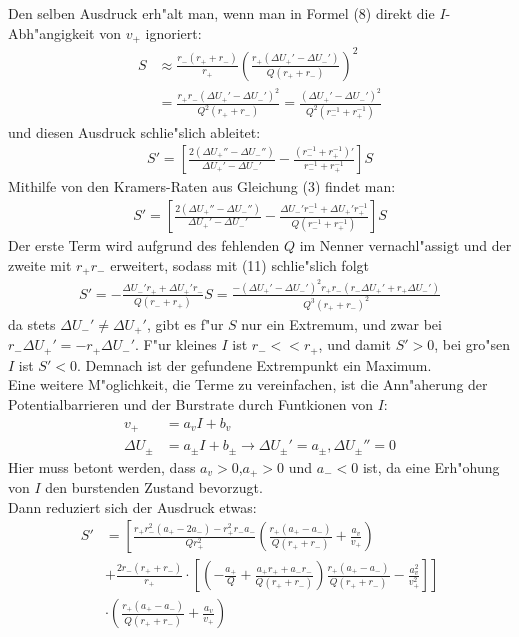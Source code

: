 \documentclass[12pt,a4paper]{article}
\begin{document}
Den selben Ausdruck erh"alt man, wenn man in Formel (8) direkt die $I$-Abh"angigkeit von $v_+$ ignoriert:
\begin{align}
S&\approx\frac{r_-(r_++r_-)}{r_+}\left(\frac{r_+(\Delta U_+'-\Delta U_-')}{Q(r_++r_-)}\right)^2\\
&=\frac{r_+r_-(\Delta U_+'-\Delta U_-')^2}{Q^2(r_++r_-)}=\frac{(\Delta U_+'-\Delta U_-')^2}{Q^2(r_-^{-1}+r_+^{-1})}
\end{align}
und diesen Ausdruck schlie"slich ableitet:
\begin{align*}
S'=\left[\frac{2(\Delta U_+''-\Delta U_-'')}{\Delta U_+'-\Delta U_-'}-\frac{(r_-^{-1}+r_+^{-1})'}{r_-^{-1}+r_+^{-1}}\right]S
\end{align*}
Mithilfe von den Kramers-Raten aus Gleichung (3) findet man:
\begin{align*}
S'=\left[\frac{2(\Delta U_+''-\Delta U_-'')}{\Delta U_+'-\Delta U_-'}-\frac{\Delta U_-'r_-^{-1}+\Delta U_+'r_+^{-1}}{Q(r_-^{-1}+r_+^{-1})}\right]S
\end{align*}
Der erste Term wird aufgrund des fehlenden $Q$ im Nenner vernachl"assigt und der zweite mit $r_+r_-$ erweitert, sodass mit (11) schlie"slich folgt
\begin{align*}
S'=-\frac{\Delta U_-'r_++\Delta U_+'r_-}{Q(r_-+r_+)}S=\frac{-(\Delta U_+'-\Delta U_-')^2r_+r_-(r_-\Delta U_+'+r_+\Delta U_-')}{Q^3(r_++r_-)^2}
\end{align*}
da stets $\Delta U_-'\neq\Delta U_+'$, gibt es f"ur $S$ nur ein Extremum, und zwar bei\\ $r_-\Delta U_+'=-r_+\Delta U_-'$. F"ur kleines $I$ ist $r_-<<r_+$, und damit $S'>0$, bei gro"sen $I$ ist $S'<0$. Demnach ist der gefundene Extrempunkt ein Maximum.\\
Eine weitere M"oglichkeit, die Terme zu vereinfachen, ist die Ann"aherung der Potentialbarrieren und der Burstrate durch Funtkionen von $I$:
\begin{align*}
v_+&=a_vI+b_v\\
\Delta U_\pm&=a_\pm I+b_\pm\rightarrow\Delta U_\pm'=a_\pm,\Delta U_\pm''=0
\end{align*}
Hier muss betont werden, dass $a_v>0$,$a_+>0$ und $a_-<0$ ist, da eine Erh"ohung von $I$ den burstenden Zustand bevorzugt.\\ 
Dann reduziert sich der Ausdruck etwas:
\begin{align*}
S'&=\left[\frac{r_+r_-^2(a_+-2a_-)-r_+^2r_-a_-}{Qr_+^2}\left(\frac{r_+(a_+-a_-)}{Q(r_++r_-)}+\frac{a_v}{v_+}\right)\right.\\
&+\left.\frac{2r_-(r_++r_-)}{r_+}\cdot \left[\left(-\frac{a_+}{Q}+\frac{a_+r_++a_-r_-}{Q(r_++r_-)}\right)\frac{r_+(a_+-a_-)}{Q(r_++r_-)}-\frac{a_v^2}{v_+^2}\right]\right]\\
&\cdot\left(\frac{r_+(a_+-a_-)}{Q(r_++r_-)}+\frac{a_v}{v_+}\right)
\end{align*}
\end{document}
